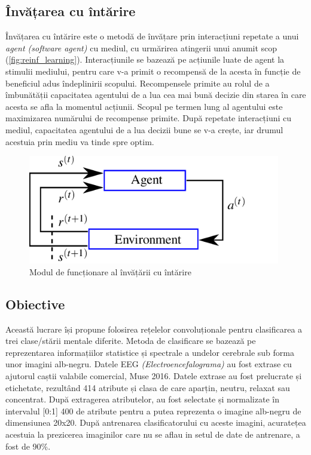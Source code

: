 \subsection*{Învățarea cu întărire}
Învățarea cu întărire este o metodă de învățare prin interacțiuni repetate a unui \textit{agent (software agent)} cu mediul, cu urmărirea atingerii unui anumit scop (\autoref*{fig:reinf_learning}). Interacțiunile se bazează pe acțiunile luate de agent la stimulii mediului, pentru care v-a primit o recompensă de la acesta în funcție de beneficiul adus îndeplinirii scopului. Recompensele primite au rolul de a îmbunătății capacitatea agentului de a lua cea mai bună decizie din starea în care acesta se afla la momentul acțiunii. Scopul pe termen lung al agentului este maximizarea numărului de recompense primite. După repetate interacțiuni cu mediul, capacitatea agentului de a lua decizii bune se v-a crește, iar drumul acestuia prin mediu va tinde spre optim.
\begin{figure}[h]
	\center
	\includegraphics[width=11cm, keepaspectratio]{fig/cap1/The-reinforcement-learning-paradigm-consists-of-an-agent-interacting-with-an.png}
	\caption{Modul de funcționare al învățării cu întărire \cite{fig:reinforcement}}
	\label{fig:reinf_learning}
\end{figure}

\subsection*{Obiective}
Această lucrare își propune folosirea rețelelor convoluționale pentru clasificarea a trei clase/stării mentale diferite. Metoda de clasificare se bazează pe reprezentarea informațiilor statistice și spectrale a undelor cerebrale sub forma unor imagini alb-negru. Datele EEG \textit{(Electroencefalograma)} au fost extrase cu ajutorul caștii valabile comercial, Muse 2016. Datele extrase au fost prelucrate și etichetate, rezultând 414 atribute și clasa de care aparțin, neutru, relaxat sau concentrat. După extragerea atributelor, au fost selectate și normalizate în intervalul [0:1] 400 de atribute pentru a putea reprezenta o imagine alb-negru de dimensiunea 20x20. După antrenarea clasificatorului cu aceste imagini, acuratețea acestuia la prezicerea imaginilor care nu se aflau in setul de date de antrenare, a fost de 90\%.


